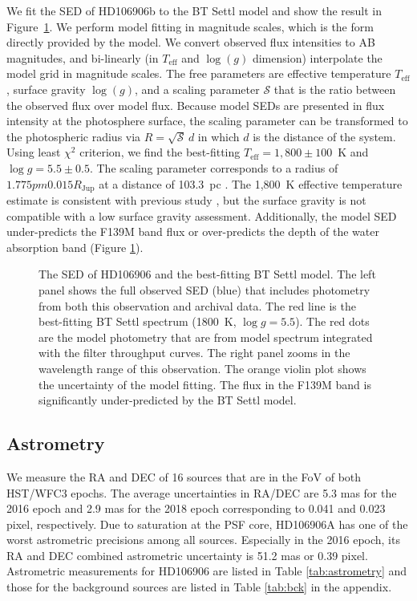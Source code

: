 \documentclass[twocolumn]{aastex62}
\newcommand{\teff}{\ensuremath{T_{\mathrm{eff}}}\xspace}
\newcommand{\logg}{\ensuremath{\log(g)}\xspace}
\begin{document}
We fit the SED of HD106906b to the BT Settl model \citep[][]{Allard2012} and show the result in Figure~\ref{fig:SED}. We perform model fitting in magnitude scales, which is the form directly provided by the model.  We convert observed flux intensities to AB magnitudes, and bi-linearly (in \teff and \logg dimension) interpolate the model grid in magnitude scales. The free parameters are effective temperature $\teff$, surface gravity $\logg$, and a scaling parameter $\mathcal{S}$ that is the ratio between the observed flux over model flux. Because model SEDs are presented in flux intensity at the photosphere surface, the scaling parameter can be transformed to the photospheric radius via $R=\sqrt{\mathcal{S}}\,d$ in which $d$ is the distance of the system. Using least $\chi^{2}$ criterion, we find the best-fitting $T_{\mathrm{eff}}=1,800\pm100$~K and $\log g=5.5\pm0.5$.  The scaling parameter corresponds to a radius of  $1.775pm0.015R_{\mathrm{Jup}}$ at a distance of 103.3~pc \citep{Gaia2018,Gaia2016}. The 1,800~K effective temperature estimate is consistent with previous study \citep{Bailey2013,Wu2016}, but the surface gravity is not compatible with a low surface gravity assessment. Additionally, the model SED under-predicts the F139M band flux or over-predicts the depth of the water absorption band (Figure \ref{fig:SED}).

\begin{figure}
  \centering
  \caption{The SED of HD106906 and the best-fitting BT Settl model. The left panel shows the full observed SED (blue) that includes photometry from both this observation and archival data. The red line is the best-fitting BT Settl spectrum (1800~K, $\log g=5.5$). The red dots are the model photometry that are from model spectrum integrated with the filter throughput curves. The right panel zooms in the wavelength range of this observation. The orange violin plot shows the uncertainty of the model fitting. The flux in the F139M band is significantly under-predicted by the BT Settl model.}
  \label{fig:SED}
\end{figure}

\subsection{Astrometry}
\label{sec:astrometry}

We measure the RA and DEC of 16 sources that are in the FoV of both HST/WFC3 epochs. The average uncertainties in RA/DEC are 5.3 mas for the 2016 epoch and 2.9 mas for the 2018 epoch corresponding to 0.041 and 0.023 pixel, respectively. Due to saturation at the PSF core, HD106906A has one of the worst astrometric precisions among all sources. Especially in the 2016 epoch, its RA and DEC combined astrometric uncertainty is 51.2 mas or 0.39 pixel. Astrometric measurements for HD106906 are listed in Table \ref{tab:astrometry} and those for the background sources are listed in Table \ref{tab:bck} in the appendix.
\end{document}
